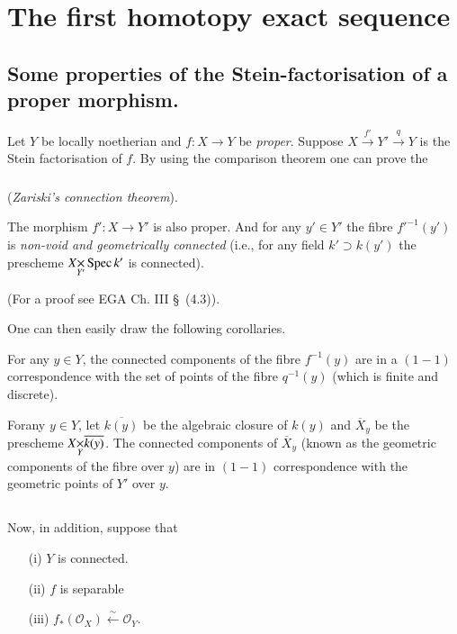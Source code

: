 \section{The first homotopy exact sequence}\label{chap6-sec6.3}

\subsection{Some properties of the Stein-factorisation of a proper
  morphism.}\label{chap6-sec6.3.1}

Let $Y$ be locally noetherian and $f:X\to Y$ be {\em proper}. Suppose
$X\xrightarrow{f'}Y'\xrightarrow{q}Y$ is the Stein factorisation of
$f$. By using the comparison theorem one can prove the

\subsubsection{}\label{chap6-sec6.3.1.1}
({\em Zariski's connection theorem}).

The morphism $f':X\to Y'$ is also proper. And for any $y'\in Y'$ the
fibre ${f'}^{-1}(y')$ is {\em non-void and geometrically connected}
(i.e., for any field $k'\supset k(y')$ the prescheme $\fprod{X}{\Spec
  k'}{Y'}$ is connected).

(For a proof see EGA Ch. III \S\ (4.3)).

One can then easily draw the following corollaries.


\setcounter{subcoro}{1}
\begin{subcoro}\label{chap6-coro6.3.1.2}
For any $y\in Y$, the connected components of the fibre $f^{-1}(y)$
are in a $(1-1)$ correspondence with the set of points of the fibre
$q^{-1}(y)$ (which is finite and discrete).
\end{subcoro}

\begin{subcoro}\label{chap6-coro6.3.1.3}
For\pageoriginale any $y\in Y$, let $\overline{k(y)}$ be the algebraic
closure of $k(y)$ and $\overline{X}_{y}$ be the prescheme
$\fprod{X}{\overline{k(y)}}{Y}$. The connected components of
$\overline{X}_{y}$ (known as the geometric components of the fibre
over $y$) are in $(1-1)$ correspondence with the geometric points of
$Y'$ over $y$. 
\end{subcoro}

\subsection{}\label{chap6-sec6.3.2}
Now, in addition, suppose that
\begin{itemize}
\item[(i)] $Y$ is connected.

\item[(ii)] $f$ is separable

\item[(iii)] $f_{\ast}(\mathscr{O}_{X})\xleftarrow{\sim}\mathscr{O}_{Y}$.
\end{itemize}

